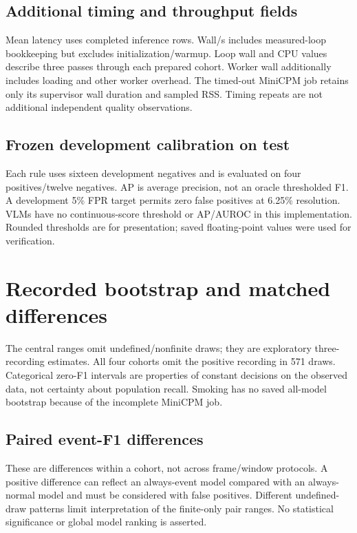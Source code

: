\documentclass[11pt,a4paper]{article}
\begin{document}
\begin{landscape}
\subsection{Additional timing and throughput fields}
\small\setlength{\tabcolsep}{5pt}

\normalsize
Mean latency uses completed inference rows. Wall/s includes measured-loop bookkeeping but excludes initialization/warmup. Loop wall and CPU values describe three passes through each prepared cohort. Worker wall additionally includes loading and other worker overhead. The timed-out MiniCPM job retains only its supervisor wall duration and sampled RSS. Timing repeats are not additional independent quality observations.
\end{landscape}

\begin{landscape}
\section{Frozen development calibration on test}
\small\setlength{\tabcolsep}{4pt}

\normalsize
Each rule uses sixteen development negatives and is evaluated on four positives/twelve negatives. AP is average precision, not an oracle thresholded F1. A development 5\% FPR target permits zero false positives at 6.25\% resolution. VLMs have no continuous-score threshold or AP/AUROC in this implementation. Rounded thresholds are for presentation; saved floating-point values were used for verification.
\end{landscape}

\clearpage\section{Recorded bootstrap and matched differences}
\small\normalsize
The central ranges omit undefined/nonfinite draws; they are exploratory three-recording estimates. All four cohorts omit the positive recording in 571 draws. Categorical zero-F1 intervals are properties of constant decisions on the observed data, not certainty about population recall. Smoking has no saved all-model bootstrap because of the incomplete MiniCPM job.
\clearpage\subsection{Paired event-F1 differences}
\small\normalsize
These are differences within a cohort, not across frame/window protocols. A positive difference can reflect an always-event model compared with an always-normal model and must be considered with false positives. Different undefined-draw patterns limit interpretation of the finite-only pair ranges. No statistical significance or global model ranking is asserted.
\end{document}
